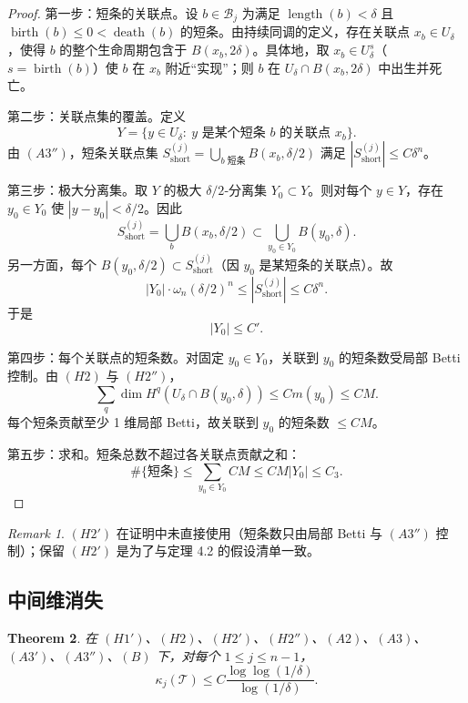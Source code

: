 \documentclass[11pt,a4paper]{article}
\newtheorem{theorem}{Theorem}[section]
\theoremstyle{remark}
\newtheorem{remark}[theorem]{Remark}
\begin{document}
	\begin{proof}
		第一步：短条的关联点。设 $b\in\mathcal B_j$ 为满足 $\operatorname{length}(b)<\delta$ 且 $\operatorname{birth}(b)\le0<\operatorname{death}(b)$ 的短条。由持续同调的定义，存在关联点 $x_b\in U_\delta$，使得 $b$ 的整个生命周期包含于 $B(x_b,2\delta)$。具体地，取 $x_b\in U_\delta^{s}$（$s=\operatorname{birth}(b)$）使 $b$ 在 $x_b$ 附近“实现”；则 $b$ 在 $U_\delta\cap B(x_b,2\delta)$ 中出生并死亡。
		
		第二步：关联点集的覆盖。定义
		\[
		Y=\bigl\{y\in U_\delta:\ y \text{ 是某个短条 } b \text{ 的关联点 } x_b\bigr\}.
		\]
		由 $(A3'')$，短条关联点集 $S_{\mathrm{short}}^{(j)}=\bigcup_{b\text{ 短条}}B(x_b,\delta/2)$ 满足 $|S_{\mathrm{short}}^{(j)}|\le C\delta^n$。
		
		第三步：极大分离集。取 $Y$ 的极大 $\delta/2$‑分离集 $Y_0\subset Y$。则对每个 $y\in Y$，存在 $y_0\in Y_0$ 使 $|y-y_0|<\delta/2$。因此
		\[
		S_{\mathrm{short}}^{(j)}=\bigcup_{b}B(x_b,\delta/2)
		\subset\bigcup_{y_0\in Y_0}B(y_0,\delta).
		\]
		另一方面，每个 $B(y_0,\delta/2)\subset S_{\mathrm{short}}^{(j)}$（因 $y_0$ 是某短条的关联点）。故
		\[
		|Y_0|\cdot\omega_n(\delta/2)^n\le|S_{\mathrm{short}}^{(j)}|\le C\delta^n.
		\]
		于是
		\[
		|Y_0|\le C'.
		\]
		
		第四步：每个关联点的短条数。对固定 $y_0\in Y_0$，关联到 $y_0$ 的短条数受局部 Betti 控制。由 $(H2)$ 与 $(H2'')$，
		\[
		\sum_q\dim H^q(U_\delta\cap B(y_0,\delta))\le Cm(y_0)\le CM.
		\]
		每个短条贡献至少 1 维局部 Betti，故关联到 $y_0$ 的短条数 $\le CM$。
		
		第五步：求和。短条总数不超过各关联点贡献之和：
		\[
		\#\{\text{短条}\}\le\sum_{y_0\in Y_0}CM\le CM|Y_0|\le C_3.
		\]
	\end{proof}
	
	\begin{remark}
		$(H2')$ 在证明中未直接使用（短条数只由局部 Betti 与 $(A3'')$ 控制）；保留 $(H2')$ 是为了与定理 4.2 的假设清单一致。
	\end{remark}
	
	\subsection{中间维消失}
	\begin{theorem}
		在 $(H1')$、$(H2)$、$(H2')$、$(H2'')$、$(A2)$、$(A3)$、$(A3')$、$(A3'')$、$(B)$ 下，对每个 $1\le j\le n-1$，
		\[
		\kappa_j(\mathcal T)\le C\frac{\log\log(1/\delta)}{\log(1/\delta)}.
		\]
	\end{theorem}
	
\end{document}
